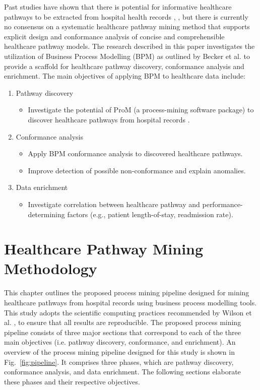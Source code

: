 Past studies have shown that there is potential for informative healthcare pathways to be extracted from hospital health records \cite{Xu2017}, \cite{Iwata2013}, but there is currently no consensus on a systematic healthcare pathway mining method that supports explicit design and conformance analysis of concise and comprehensible healthcare pathway models. The research described in this paper investigates the utilization of Business Process Modelling (BPM) as outlined by Becker et al. \cite{Becker2000} to provide a scaffold for healthcare pathway discovery, conformance analysis and enrichment. The main objectives of applying BPM to healthcare data include:
\begin{enumerate}
    \item Pathway discovery
    \begin{itemize}
        \item Investigate the potential of ProM (a process-mining software package) to discover healthcare pathways from hospital records \cite{VanDongen2005}.
    \end{itemize}
    \item Conformance analysis
    \begin{itemize}
        \item Apply BPM conformance analysis to discovered healthcare pathways. 
        \item Improve detection of possible non-conformance and explain anomalies.
    \end{itemize}
    \item Data enrichment
    \begin{itemize}
        \item Investigate correlation between healthcare pathway and performance-determining factors (e.g., patient length-of-stay, readmission rate).
    \end{itemize}
\end{enumerate}

\section{Healthcare Pathway Mining Methodology}
This chapter outlines the proposed process mining pipeline designed for mining healthcare pathways from hospital records using business process modelling tools. This study adopts the scientific computing practices recommended by Wilson et al. \cite{Wilson2014}, \cite{Wilson2017} to ensure that all results are reproducible. The proposed process mining pipeline consists of three major sections that correspond to each of the three main objectives (i.e. pathway discovery, conformance, and enrichment). An overview of the process mining pipeline designed for this study is shown in Fig.~\ref{fig:pipeline}. It comprises three phases, which are pathway discovery, conformance analysis, and data enrichment. The following sections elaborate these phases and their respective objectives.

